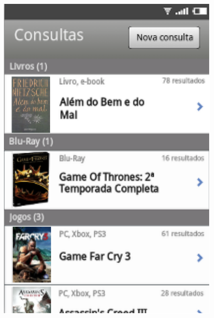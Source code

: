 \begin{figure}[ht]
        \begin{minipage}{.5\textwidth}
            \includegraphics[scale=1]{tela/TelaHistorico}
        \end{minipage}
        \begin{minipage}{.5\textwidth}

\end{minipage}
\end{figure}

